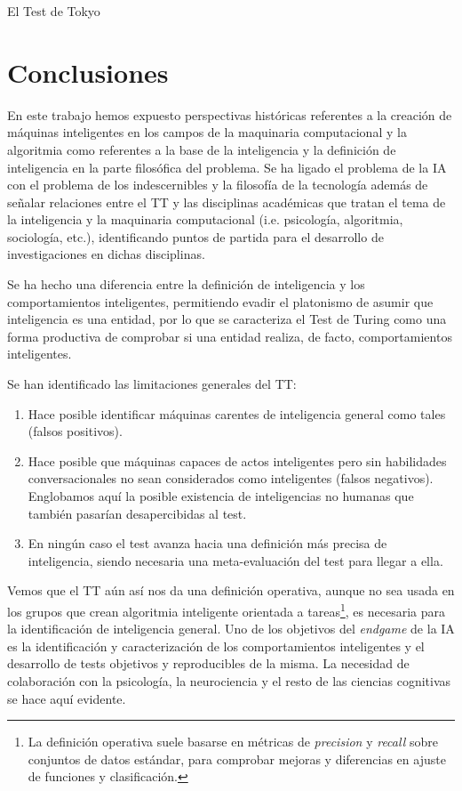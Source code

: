 \documentclass[12pt]{memoir}
\begin{document}
El Test de Tokyo 


\chapter{Conclusiones}

En este trabajo hemos expuesto perspectivas históricas referentes a la creación de máquinas inteligentes en los campos de la maquinaria computacional y la algoritmia como referentes a la base de la inteligencia y la definición de inteligencia en la parte filosófica del problema. Se ha ligado el problema de la IA con el problema de los indescernibles y la filosofía de la tecnología además de señalar relaciones entre el TT y las disciplinas académicas que tratan el tema de la inteligencia y la maquinaria computacional (i.e. psicología, algoritmia, sociología, etc.), identificando puntos de partida para el desarrollo de investigaciones en dichas disciplinas.

Se ha hecho una diferencia entre la definición de inteligencia y los comportamientos inteligentes, permitiendo evadir el platonismo de asumir que inteligencia es una entidad, por lo que se caracteriza el Test de Turing como una forma productiva de comprobar si una entidad realiza, de facto, comportamientos inteligentes. 

Se han identificado las limitaciones generales del TT:

\begin{enumerate}
	\item Hace posible identificar máquinas carentes de inteligencia general como tales (falsos positivos).
	\item Hace posible que máquinas capaces de actos inteligentes pero sin habilidades conversacionales no sean considerados como inteligentes (falsos negativos). Englobamos aquí la posible existencia de inteligencias no humanas que también pasarían desapercibidas al test.
	\item En ningún caso el test avanza hacia una definición más precisa de inteligencia, siendo necesaria una meta-evaluación del test para llegar a ella.
\end{enumerate}

Vemos que el TT aún así nos da una definición operativa, aunque no sea usada en los grupos que crean algoritmia inteligente orientada a tareas\footnote{La definición operativa suele basarse en métricas de \textit{precision} y \textit{recall} sobre conjuntos de datos estándar, para comprobar mejoras y diferencias en ajuste de funciones y clasificación.}, es necesaria para la identificación de inteligencia general. Uno de los objetivos del \textit{endgame} de la IA es la identificación y caracterización de los comportamientos inteligentes y el desarrollo de tests objetivos y reproducibles de la misma. La necesidad de colaboración con la psicología, la neurociencia y el resto de las ciencias cognitivas se hace aquí evidente.
\end{document}
